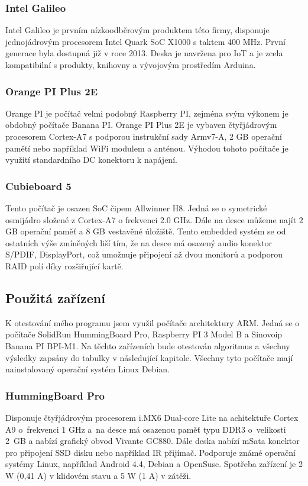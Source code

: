 \subsubsection*{Intel Galileo}
Intel Galileo je prvním nízkoodběrovým produktem této firmy, disponuje jednojádrovým procesorem Intel Quark SoC X1000 s taktem 400 MHz. První generace byla dostupná již v roce 2013. Deska je navržena pro IoT a je zcela kompatibilní s produkty, knihovny a vývojovým prostředím Arduina. 

\subsubsection*{Orange PI Plus 2E}
Orange PI je počítač velmi podobný Raspberry PI, zejména svým výkonem je obdobný počítače Banana PI. Orange PI Plus 2E je vybaven čtyřjádrovým procesorem Cortex-A7 s podporou instrukční sady Armv7-A, 2 GB operační pamětí nebo například WiFi modulem a anténou. Výhodou tohoto počítače je využití standardního DC konektoru k napájení.

\subsubsection*{Cubieboard 5}
Tento počítač je osazen SoC čipem Allwinner H8. Jedná se o symetrické osmijádro složené z Cortex-A7 o frekvenci 2.0 GHz. Dále na desce můžeme najít 2 GB operační paměť a 8 GB vestavěné úložiště. Tento embedded systém se od ostatních výše zmíněných liší tím, že na desce má osazený audio konektor S/PDIF, DisplayPort, což umožnuje připojení až dvou monitorů a podporou RAID polí díky rozšiřující kartě. 


\subsection{Použitá zařízení}
K otestování mého programu jsem využil počítače architektury ARM. Jedná se o počítače SolidRun HummingBoard Pro, Raspberry PI 3 Model B a Sinovoip Banana PI BPI-M1. Na těchto zařízeních bude otestován algoritmus a všechny výsledky zapsány do tabulky v následující kapitole. Všechny tyto počítače mají nainstalovaný operační systém Linux Debian.

\subsubsection*{HummingBoard Pro}
 Disponuje čtyřjádrovým procesorem i.MX6 Dual-core Lite na achitektuře Cortex A9 o~frekvenci 1 GHz a~na desce má osazenou paměť typu DDR3 o~velikosti 2~GB a nabízí grafický obvod Vivante GC880. Dále deska nabízí mSata konektor pro připojení SSD disku nebo například IR přijímač. Podporuje známé operační systémy Linux, například Android 4.4, Debian a OpenSuse. Spotřeba zařízení je 2 W (0,41 A) v klidovém stavu a 5 W (1 A) v zátěži.

